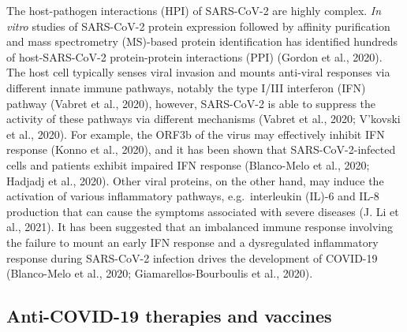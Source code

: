 \documentclass[12pt,twoside,openany,\mydriver]{thesis}  %
\begin{document}
The host-pathogen interactions (HPI) of SARS-CoV-2 are highly complex. \emph{In vitro} studies of SARS-CoV-2 protein expression followed by affinity purification and mass spectrometry (MS)-based protein identification has identified hundreds of host-SARS-CoV-2 protein-protein interactions (PPI) (Gordon et al., 2020). The host cell typically senses viral invasion and mounts anti-viral responses via different innate immune pathways, notably the type I/III interferon (IFN) pathway (Vabret et al., 2020), however, SARS-CoV-2 is able to suppress the activity of these pathways via different mechanisms (Vabret et al., 2020; V'kovski et al., 2020). For example, the ORF3b of the virus may effectively inhibit IFN response (Konno et al., 2020), and it has been shown that SARS-CoV-2-infected cells and patients exhibit impaired IFN response (Blanco-Melo et al., 2020; Hadjadj et al., 2020). Other viral proteins, on the other hand, may induce the activation of various inflammatory pathways, e.g.~interleukin (IL)-6 and IL-8 production that can cause the symptoms associated with severe diseases (J. Li et al., 2021). It has been suggested that an imbalanced immune response involving the failure to mount an early IFN response and a dysregulated inflammatory response during SARS-CoV-2 infection drives the development of COVID-19 (Blanco-Melo et al., 2020; Giamarellos-Bourboulis et al., 2020).

\hypertarget{intro-covid-therapy}{%
\subsection{Anti-COVID-19 therapies and vaccines}\label{intro-covid-therapy}}
\end{document}
